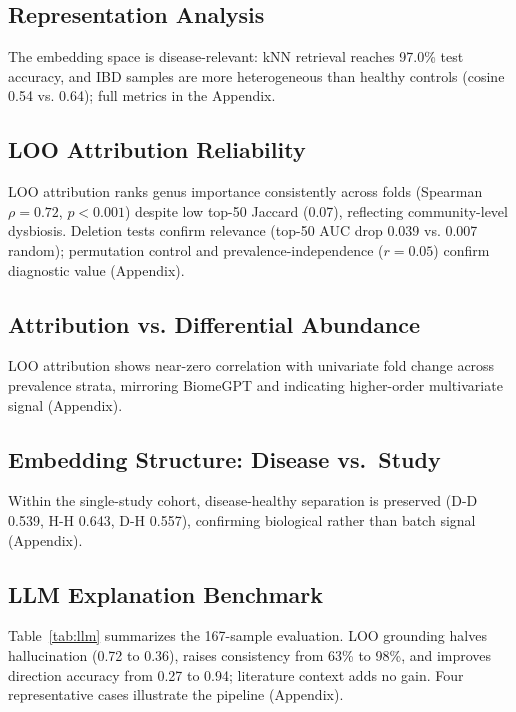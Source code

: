 \documentclass{article} %
\begin{document}
\subsection{Representation Analysis}

The embedding space is disease-relevant: kNN retrieval reaches 97.0\% test accuracy, and IBD samples are more heterogeneous than healthy controls (cosine 0.54 vs. 0.64); full metrics in the Appendix.

\subsection{LOO Attribution Reliability}

LOO attribution ranks genus importance consistently across folds (Spearman $\rho{=}0.72$, $p{<}0.001$) despite low top-50 Jaccard (0.07), reflecting community-level dysbiosis. Deletion tests confirm relevance (top-50 AUC drop 0.039 vs. 0.007 random); permutation control and prevalence-independence ($r{=}0.05$) confirm diagnostic value (Appendix).

\subsection{Attribution vs. Differential Abundance}

LOO attribution shows near-zero correlation with univariate fold change across prevalence strata, mirroring BiomeGPT and indicating higher-order multivariate signal (Appendix).

\subsection{Embedding Structure: Disease vs.\ Study}

Within the single-study cohort, disease-healthy separation is preserved (D-D 0.539, H-H 0.643, D-H 0.557), confirming biological rather than batch signal (Appendix).

\subsection{LLM Explanation Benchmark}

Table~\ref{tab:llm} summarizes the 167-sample evaluation. LOO grounding halves hallucination (0.72 to 0.36), raises consistency from 63\% to 98\%, and improves direction accuracy from 0.27 to 0.94; literature context adds no gain. Four representative cases illustrate the pipeline (Appendix).
\end{document}
